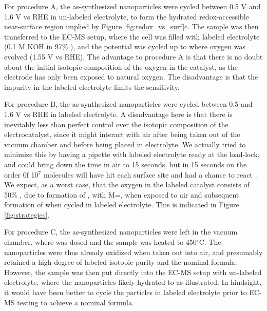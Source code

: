 For procedure A, the as-synthesized nanoparticles were cycled between 0.5 V and 1.6 V vs RHE in un-labeled electrolyte, to form the hydrated redox-accessible near-surface region implied by Figure \ref{fig:redox_vs_surf}c. The sample was then transferred to the EC-MS setup, where the cell was filled with labeled electrolyte (0.1 M KOH in 97\% ), and the potential was cycled up to where oxygen was evolved (1.55 V vs RHE). The advantage to procedure A is that there is no doubt about the initial isotopic composition of the oxygen in the catalyst, as the electrode has only been exposed to natural oxygen. The disadvantage is that the  impurity in the labeled electrolyte limits the sensitivity. 

For procedure B, the as-synthesized nanoparticles were cycled between 0.5 and 1.6 V vs RHE in labeled electrolyte. A disadvantage here is that there is inevitably less than perfect control over the isotopic composition of the electrocatalyst, since it might interact with air after being taken out of the vacuum chamber and before being placed in electrolyte. We actually tried to minimize this by having a pipette with labeled electrolyte ready at the load-lock, and could bring down the time in air to 15 seconds, but in 15 seconds on the order 0f 10$^7$  molecules will have hit each surface site and had a chance to react \cite{Concepts2003}. We expect, as a worst case, that the oxygen in the labeled catalyst consists of 50\% , due to formation of , with M=, when exposed to air and subsequent formation of  when cycled in labeled electrolyte. This is indicated in Figure \ref{fig:strategies}.

For procedure C, the as-synthesized nanoparticles were left in the vacuum chamber, where  was dosed and the sample was heated to 450$^\circ$C. The nanoparticles were thus already oxidized when taken out into air, and presumably retained a high degree of labeled isotopic purity and the nominal  formula. However, the sample was then put directly into the EC-MS setup with un-labeled electrolyte, where the nanoparticles likely hydrated to  as illustrated. In hindsight, it would have been better to cycle the particles in labeled electrolyte prior to EC-MS testing to achieve a nominal  formula.

